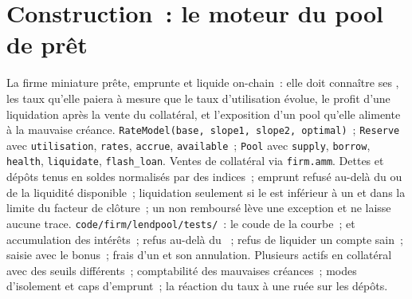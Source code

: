 \section{Construction~: le moteur du pool de prêt}\label{bld:m3:defi-credit-and-leverage:lendpool}

\begin{build}
 La firme miniature prête, emprunte et liquide on-chain~: elle doit connaître ses , les taux qu'elle paiera à mesure que le taux d'utilisation évolue,
le profit d'une liquidation après la vente du collatéral, et l'exposition d'un pool qu'elle alimente à la mauvaise créance.
 \texttt{RateModel(base, slope1, slope2, optimal)}~; \texttt{Reserve} avec \texttt{utilisation}, \texttt{rates}, \texttt{accrue},
\texttt{available}~; \texttt{Pool} avec \texttt{supply}, \texttt{borrow}, \texttt{health}, \texttt{liquidate}, \texttt{flash\_loan}. Ventes de collatéral via
\texttt{firm.amm}.
 Dettes et dépôts tenus en soldes normalisés par des indices~; emprunt refusé au-delà du  ou de la liquidité disponible~; liquidation
seulement si le  est inférieur à un et dans la limite du facteur de clôture~; un  non remboursé lève une exception et ne laisse aucune trace.
 \texttt{code/firm/lendpool/tests/}~: le coude de la courbe~;  et accumulation des intérêts~; refus au-delà du ~; refus de liquider un
compte sain~; saisie avec le bonus~; frais d'un  et son annulation.
 Plusieurs actifs en collatéral avec des seuils différents~; comptabilité des mauvaises créances~; modes d'isolement et caps d'emprunt~; la réaction du taux à une ruée sur
les dépôts.
\end{build}

